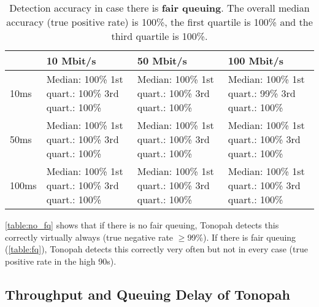\documentclass[conference]{IEEEtran}
\begin{document}
\begin{table}
\begin{tabularx}{\columnwidth}{| l | X | X | X |}
\hline
& 10 Mbit/s & 50 Mbit/s & 100 Mbit/s \\ \hline
10ms & Median: 100\% \newline 1st quart.: 100\% \newline 3rd quart.: 100\% & Median: 100\% \newline 1st quart.: 100\% \newline 3rd quart.: 100\% & Median: 100\% \newline 1st quart.: 99\% \newline 3rd quart.: 100\%\\ \hline
50ms & Median: 100\% \newline 1st quart.: 100\% \newline 3rd quart.: 100\% & Median: 100\% \newline 1st quart.: 100\% \newline 3rd quart.: 100\% & Median: 100\% \newline 1st quart.: 100\% \newline 3rd quart.: 100\% \\ \hline
100ms & Median: 100\% \newline 1st quart.: 100\% \newline 3rd quart.: 100\% & Median: 100\% \newline 1st quart.: 100\% \newline 3rd quart.: 100\% & Median: 100\% \newline 1st quart.: 100\% \newline 3rd quart.: 100\% \\ \hline
\end{tabularx}
\caption{Detection accuracy in case there is \textbf{fair queuing}.  The overall median accuracy (true positive rate) is 100\%, the first quartile is 100\% and the third quartile is 100\%.}
\label{table:fq}
\end{table}    

\autoref{table:no_fq} shows that if there is no fair queuing, Tonopah detects this correctly virtually always (true negative rate $\geq$99\%). 
If there is fair queuing (\autoref{table:fq}), Tonopah detects this correctly very often but not in every case (true positive rate in the high 90s). 

\subsection{Throughput and Queuing Delay of Tonopah}
\end{document}
